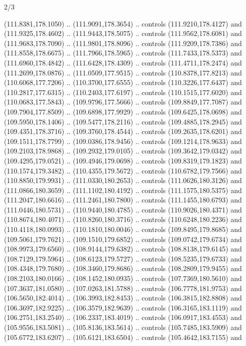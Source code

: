 \begin{flagdescription}{2/3}
\begin{scope}[shift={(0.5\flaglength,0.5)},scale=\flagwidth/320]
\begin{scope}[y=0.8pt, x=0.8pt, yscale=-1,shift={(-118.3,-146)}]
  (111.8381,178.1050) .. (111.9091,178.3654) .. controls (111.9210,178.4127) and
  (111.9325,178.4602) .. (111.9443,178.5075) .. controls (111.9562,178.6081) and
  (111.9683,178.7090) .. (111.9801,178.8096) .. controls (111.9209,178.7386) and
  (111.8558,178.6675) .. (111.7966,178.5965) .. controls (111.7433,178.5373) and
  (111.6960,178.4842) .. (111.6428,178.4309) .. controls (111.4711,178.2474) and
  (111.2699,178.0876) .. (111.0509,177.9515) .. controls (110.8378,177.8213) and
  (110.6068,177.7206) .. (110.3700,177.6555) .. controls (110.3226,177.6437) and
  (110.2817,177.6315) .. (110.2403,177.6197) .. controls (110.1515,177.6020) and
  (110.0683,177.5843) .. (109.9796,177.5666) .. controls (109.8849,177.7087) and
  (109.7904,177.8509) .. (109.6898,177.9929) .. controls (109.6425,178.0698) and
  (109.5950,178.1406) .. (109.5477,178.2116) .. controls (109.4885,178.2945) and
  (109.4351,178.3716) .. (109.3760,178.4544) .. controls (109.2635,178.6201) and
  (109.1511,178.7799) .. (109.0386,178.9456) .. controls (109.1214,178.9633) and
  (109.2103,178.9868) .. (109.2932,179.0105) .. controls (109.3642,179.0342) and
  (109.4295,179.0521) .. (109.4946,179.0698) .. controls (109.8319,179.1823) and
  (110.1574,179.3482) .. (110.4355,179.5672) .. controls (110.6782,179.7566) and
  (110.8850,179.9931) .. (111.0330,180.2653) .. controls (111.0626,180.3126) and
  (111.0866,180.3659) .. (111.1102,180.4192) .. controls (111.1575,180.5375) and
  (111.2047,180.6616) .. (111.2461,180.7800) .. controls (111.1455,180.6793) and
  (111.0446,180.5731) .. (110.9440,180.4785) .. controls (110.9026,180.4371) and
  (110.8674,180.4071) .. (110.8260,180.3716) .. controls (110.6248,180.2236) and
  (110.4118,180.0993) .. (110.1810,180.0046) .. controls (109.8495,179.8685) and
  (109.5061,179.7621) .. (109.1510,179.6852) .. controls (109.0742,179.6734) and
  (108.9973,179.6560) .. (108.9144,179.6382) .. controls (108.8138,179.6145) and
  (108.7129,179.5964) .. (108.6123,179.5727) .. controls (108.5235,179.6733) and
  (108.4348,179.7680) .. (108.3460,179.8686) .. controls (108.2809,179.9455) and
  (108.2103,180.0166) .. (108.1452,180.0935) .. controls (107.7369,180.5610) and
  (107.3637,181.0580) .. (107.0263,181.5788) .. controls (106.7778,181.9753) and
  (106.5650,182.4014) .. (106.3993,182.8453) .. controls (106.3815,182.8808) and
  (106.3697,182.9225) .. (106.3579,182.9639) .. controls (106.3165,183.1119) and
  (106.2751,183.2540) .. (106.2337,183.4019) .. controls (106.0917,183.4553) and
  (105.9556,183.5081) .. (105.8136,183.5614) .. controls (105.7485,183.5909) and
  (105.6772,183.6207) .. (105.6121,183.6504) .. controls (105.4642,183.7155) and

\end{scope}
\end{scope}
\end{flagdescription}
